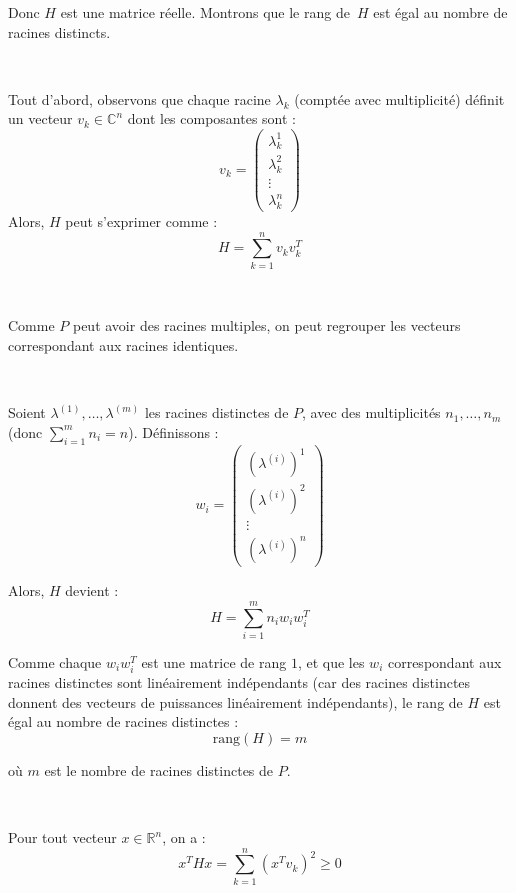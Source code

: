 Donc $H$ est une matrice r{\'e}elle. Montrons que le rang de~$H$ est {\'e}gal
au nombre de racines distincts.

\

Tout d'abord, observons que chaque racine $\lambda_k$ (compt{\'e}e avec
multiplicit{\'e}) d{\'e}finit un vecteur $v_k \in \mathbb{C}^n$ dont les
composantes sont :
\[ v_k = \left(\begin{array}{c}
     \lambda_k^1\\
     \lambda_k^2\\
     \vdots\\
     \lambda_k^n
   \end{array}\right) \]
Alors, $H$ peut s'exprimer comme :
\[ H = \sum_{k = 1}^n v_k v_k^T \]


\

Comme $P$ peut avoir des racines multiples, on peut regrouper les vecteurs
correspondant aux racines identiques.

\

Soient $\lambda^{(1)}, \ldots, \lambda^{(m)}$ les racines distinctes de $P$,
avec des multiplicit{\'e}s $n_1, \ldots, n_m$ (donc $\sum_{i = 1}^m n_i = n$).
D{\'e}finissons :
\[ w_i = \left(\begin{array}{c}
     (\lambda^{(i)})^1\\
     (\lambda^{(i)})^2\\
     \vdots\\
     (\lambda^{(i)})^n
   \end{array}\right) \]


Alors, $H$ devient :
\[ H = \sum_{i = 1}^m n_i w_i w_i^T \]


Comme chaque $w_i w_i^T$ est une matrice de rang $1$, et que les $w_i$
correspondant aux racines distinctes sont lin{\'e}airement ind{\'e}pendants
(car des racines distinctes donnent des vecteurs de puissances
lin{\'e}airement ind{\'e}pendants), le rang de $H$ est {\'e}gal au nombre de
racines distinctes :
\[ \mathrm{rang} (H) = m \]


o{\`u} $m$ est le nombre de racines distinctes de $P$.

\

Pour tout vecteur $x \in \mathbb{R}^n$, on a :
\[ x^T Hx = \sum_{k = 1}^n (x^T v_k)^2 \geq 0 \]


